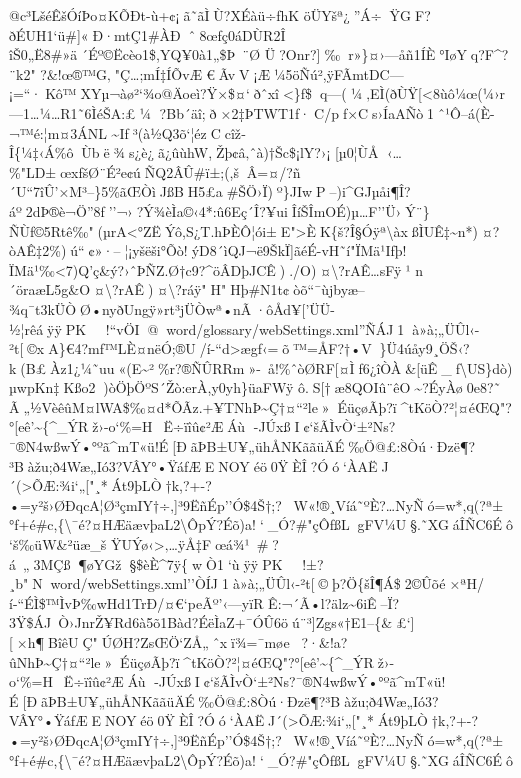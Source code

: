 @c³L­šéÊšÓíÞ\textbar o¤KÕÐt-ù+¢¡ã˜ãÌÙ?XÉàü÷fhK
öÜY šª¿''Á÷ŸGF?ðÉUH1`ü\#{]}«Ð·mtÇ1\#ÀÐˆ8œfç0áDÙR2Î
îŠ0„Ë8\#»ä´Éº©Ëcèo1\$,YQ¥0à1„\$Þ~¨Ø
Ü?Onr?{]}‰r»\}¤›---åñ1ÍÈ°IøYq?F\^{}?¨k2"
?\&!œ®™G‚"Ç\ldots;mÍ‡ÍÕ­v Æ€ÃvV¡Æ\textbar¼5öÑú²,ÿFÃmtDC---¡=``·Kô™XYµ\textbar¬àø²`¾o@Äoeì?Ÿ×\$¤`ðˆxî\textless\}ƒ\$q---(¼‚EÌ(ðÙŸ{[}\textless8ùô¼œ(¼›r---1\ldots¼\ldots R1˜6ÌéŠA:£¼
?Bb´äî;ð×2‡ÞTWT1ƒ·C/pƒ×Cs›ÍaAÑò1ˆ¹Ô--á(È-¬™é:¦m¤3ÁNL
\textasciitilde Iƒ³(à½Q3õ`¦ézCcîž­Î\{¼‡‹Á\%ôÙbë¾s¿è¿ã¿ûùh W,Žþ¢â‚ˆà)†\textquotesingle Šc\$¡l Y\textquotesingle?›¡­
{[}µ0¦ÙÅ
‹\ldots\%"LD±œxfšØ¨É²e¢úÑQ2ÂÛ\#ï±;(,šÂ=¤/?ñ´U``7îÛ'×M³--\}5\%ãŒÒìJßBH5£a\#ŠÖ›Ï)º\}JIwP--)i\^{}GJµåi¶Î?áº2dÞ®è¬Ö''8ƒ''¬›?Ý¾èÌa©‹4*:û6Eç´Î?¥uiÎíŠÎmOÉ)µ\ldots F''Ü›Ý¨\}ÑÙf©5\textbar Rtê‰"(µrA\textless°ZËÝô,S¿T.hÞÈÔ¦ói±E"\textgreater ÈK\{š?Î§Óÿª\textbackslash àxßÌUÊ‡\textasciitilde n*)¤\textbar?òAÊ‡2\%)ú``¢»·--¦¡yšëši°Õò!ýD8´ìQJ¬ë9ŠkÏ{]}ãéÉ-v­H˜\textbar í"ÏMä¹Iƒþ!ÏMä¹‰\textless7)Q'ç\&ý?›ˆÞÑZ.Ø†c9?\^{}öÂDþJCÊ)./O)¤\textbackslash?rAÊ\ldots sFÿ¹
n´öraæL5g\&O¤\textbackslash?rAÊ)¤\textbackslash?ráÿ"H"Hþ\#N1t¢òõ``¯ùjbyæ--¾q¯t3kÜÒØ•nyðUngÿ»rt³jÜÒwª•nÃ·ôÅd¥{[}'ÜÜ-½¦rêá   ÿÿ PK     ! ``vÖI  @     word/glossary/webSettings.xml''ÑÁJ1à»à;„ÜÛl‹-²t{[}©xA\}€4?mƒ™LÈ¤nëÓ;®U/í-``d\textgreater ægf‹=õ™=ÅF?†•V­\}Ü4úåy9¸ÖŠ‹?k(B£Àz1¿¼˜uu«\textquotesingle(E\textasciitilde²\%r?®ÑÛRRm»-~å!\%ˆòØRF{[}¤Ìƒ6¿îÒÀ\&{[}üÊ\_f\textbackslash US\}dò)
µ­wpKn‡Kßo2)òÖ\textquotesingle þÖºS´Žò:erÀ,y0\textbar yh\}üaFWÿ
ô.S{[}†æ8QOIû¨êO\textasciitilde?ÉyÀø0e8?˜
Ã„½VèêûM¤lWA\$‰¤d*ÕÃz.+¥TNhÞ\textasciitilde Ç†¤``²le»ÉüçøÃþ?ï\^{}tKöÒ?²¦¤éŒQ"?°{[}eê'\textasciitilde\{\^{}\_ÝRž›-o­`\%=H~Ë÷ïîû¢²ÆÁù
-JÚxßI¢`šÃÌvÒ`±²Ns?¯®N4wßwÝ•°ºã\^{}mT«ü!É{[}ÐãÞB±U¥„ühÅNKããüÄÉ‰Ö@£:8Òú·Ðzë¶?³Bàžu;ð4Wæ„Ió3?VÂY°•ŸáfÆENOYéö0ŸÈÎ ?Óó`ÀAËJ´(\textgreater ÕÆ:¾i`„{[}"¸*Át9þLÒ†k,?+-?\textbar•=y²š›ØÐqcA¦Ø³çmIY†÷‚{]}³9ËñÉp''Ó\$4Š†;?W«!®¸Víá˜ºÈ?\ldots NyÑó=w*,q(?ª±°ƒ+é\#c,\{\textbackslash¯é?¤HÆäævþaL2\textbackslash ÔpÝ?Éõ)a!`\_Ó?\#"çÔƒßLgFV¼U§.˜XGáÎÑC6Éô
`š‰üW\&²üæ\_š
ŸUÝø‹\textgreater‚\ldots ÿÅ‡Fœ\textbar á¾¹~\#?á~„3MÇß¶øYGž§\$èÈ\^{}7ÿ\{wÒ1`ù  ÿÿ PK     ! ±?¸b"  N     word/webSettings.xml''ÒÍJ1 à»à;„ÜÛl‹-²t{[}©þ?Ö\{šÎ¶Á\$2©Ûõé×ªH/í-``É\textbar Ì\$™ÌvÞ‰wHd1TrÐ/¤€`peÃº'‹---yïR
Ê:¬´Ã •l?älz\textasciitilde6iÊ--Ï?3Ÿ\$ÁJ~Ò›JnrŽ¥Rd6à5õ1Bàd?ÉëÌaZ+¯ÓÛ6öú¨³{]}Zgs«†E1--\{\&£`{]}{[}×h¶BîêUÇ"ÚØH?ZsŒÖ`ZÅ„ˆxï¾=¯møe?·\&!a?ûNhÞ\textasciitilde Ç†¤``²le»ÉüçøÃþ?ï\^{}tKöÒ?²¦¤éŒQ"?°{[}eê'\textasciitilde\{\^{}\_ÝRž›-o­`\%=H~Ë÷ïîû¢²ÆÁù
-JÚxßI¢`šÃÌvÒ`±²Ns?¯®N4wßwÝ•°ºã\^{}mT«ü!É{[}ÐãÞB±U¥„ühÅNKããüÄÉ‰Ö@£:8Òú·Ðzë¶?³Bàžu;ð4Wæ„Ió3?VÂY°•ŸáfÆENOYéö0ŸÈÎ ?Óó`ÀAËJ´(\textgreater ÕÆ:¾i`„{[}"¸*Át9þLÒ†k,?+-?\textbar•=y²š›ØÐqcA¦Ø³çmIY†÷‚{]}³9ËñÉp''Ó\$4Š†;?W«!®¸Víá˜ºÈ?\ldots NyÑó=w*,q(?ª±°ƒ+é\#c,\{\textbackslash¯é?¤HÆäævþaL2\textbackslash ÔpÝ?Éõ)a!`\_Ó?\#"çÔƒßLgFV¼U§.˜XGáÎÑC6Éô
